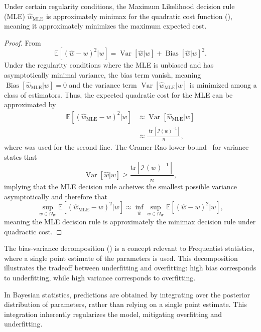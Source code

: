 \begin{corollary}
	\label{cor:MLE_minimax}
	Under certain regularity conditions, the Maximum Likelihood decision rule (MLE) $\hat{w}_{\text{MLE}}$ is approximately minimax for the quadratic cost function (), meaning it approximately minimizes the maximum expected cost.
	
	\begin{proof}
		From 
		\begin{equation}
			\mathbb{E}[(\hat{w}-w)^2|w] = \operatorname{Var}[\hat{w}|w]+\operatorname{Bias}[\hat{w}|w]^2.
		\end{equation}
		Under the regularity conditions where the MLE is unbiased and has asymptotically minimal variance, the bias term vanish, meaning $\operatorname{Bias}[\hat{w}_{\text{MLE}}|w] = 0$ and the variance term $\operatorname{Var}[\hat{w}_{\text{MLE}}|w]$ is minimized among a class of estimators. Thus, the expected quadratic cost for the MLE can be approximated by
		\begin{equation}
			\begin{split}
				\mathbb{E}[(\hat{w}_{\text{MLE}}-w)^2|w] &\approx \operatorname{Var}[\hat{w}_{\text{MLE}}|w]\\
				&\approx \frac{\operatorname{tr}[\mathcal{I}(w)^{-1}]}{n},
			\end{split}
		\end{equation}
		where  was used for the second line. The Cramer-Rao lower bound~\citep{Rao1973Linear} for variance states that 
		\begin{equation}
			\operatorname{Var}[\hat{w}|w]\geq \frac{\text{tr}[\mathcal{I}(w)^{-1}]}{n},
		\end{equation}
		implying that the MLE decision rule acheives the smallest possible variance asymptotically and therefore that 
		\begin{equation}
			\sup_{w\in \Omega_W}\mathbb{E}[(\hat{w}_{\text{MLE}}-w)^2|w]\approx \inf_{\hat{w}} \sup_{w \in \Omega_W} \mathbb{E}[(\hat{w} - w)^2|w],
		\end{equation}
		meaning the MLE decision rule is approximately the minimax decision rule under quadractic cost.
	\end{proof}
\end{corollary}

\begin{remark}
	The bias-variance decomposition () is a concept relevant to Frequentist statistics, where a single point estimate of the parameters is used. This decomposition illustrates the tradeoff between underfitting and overfitting: high bias corresponds to underfitting, while high variance corresponds to overfitting. \newline
	
	In Bayesian statistics, predictions are obtained by integrating over the posterior distribution of parameters, rather than relying on a single point estimate. This integration inherently regularizes the model, mitigating overfitting and underfitting.
\end{remark}


